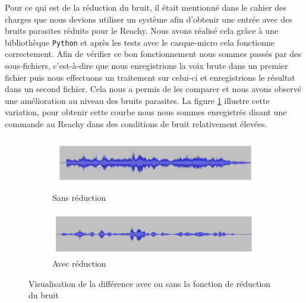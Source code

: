 \documentclass[a4paper,french]{article}
\begin{document}
Pour ce qui est de la réduction du bruit, il était mentionné dans le cahier des charges que nous devions utiliser un système afin d'obtenir une entrée avec des bruits parasites réduits pour le Reachy. Nous avons réalisé cela grâce à une bibliothèque \texttt{Python} et après les tests avec le casque-micro cela fonctionne correctement. Afin de vérifier ce bon fonctionnement nous sommes passés par des sous-fichiers, c'est-à-dire que nous enregistrions la voix brute dans un premier fichier puis nous effectuons un traitement sur celui-ci et enregistrions le résultat dans un second fichier. Cela nous a permis de les comparer et nous avons observé une amélioration au niveau des bruits parasites. La figure \ref{fig:reduction} illustre cette variation, pour obtenir cette courbe nous nous sommes enregistrés disant une commande au Reachy dans des conditions de bruit relativement élevées. \\

\begin{figure}[!ht]
    \centering
    \begin{subfigure}{1\textwidth}
        \includegraphics[width=\textwidth]{figures/sans_reduction.png}
        \caption{Sans réduction}
    \end{subfigure}
    \begin{subfigure}{1\textwidth}
        \includegraphics[width=\textwidth]{figures/avec_reduction.png}
        \caption{Avec réduction}
    \end{subfigure}
    \caption{Visualisation de la différence avec ou sans la fonction de réduction du bruit} 
    \label{fig:reduction}
\end{figure}
\end{document}
